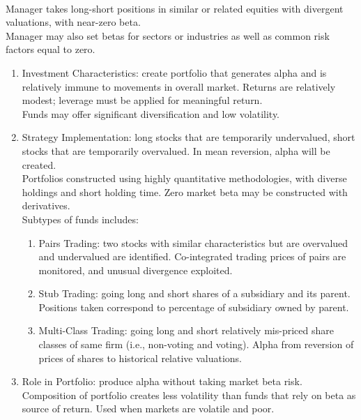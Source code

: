 \begin{remark} \\
Manager takes long-short positions in similar or related equities with divergent valuations, with near-zero beta.\\
Manager may also set betas for sectors or industries as well as common risk factors equal to zero.
\begin{enumerate}[label=\roman*.]
\setlength{\itemsep}{0pt}
\item Investment Characteristics: create portfolio that generates alpha and is relatively immune to movements in overall market. Returns are relatively modest; leverage must be applied for meaningful return.\\
Funds may offer significant diversification and low volatility.
\item Strategy Implementation: long stocks that are temporarily undervalued, short stocks that are temporarily overvalued. In mean reversion, alpha will be created.\\
Portfolios constructed using highly quantitative methodologies, with diverse holdings and short holding time. Zero market beta may be constructed with derivatives.\\
Subtypes of funds includes:
\begin{enumerate}[label=\arabic*.]
\setlength{\itemsep}{0pt}
\item Pairs Trading: two stocks with similar characteristics but are overvalued and undervalued are identified. Co-integrated trading prices of pairs are monitored, and unusual divergence exploited.
\item Stub Trading: going long and short shares of a subsidiary and its parent. Positions taken correspond to percentage of subsidiary owned by parent.
\item Multi-Class Trading: going long and short relatively mis-priced share classes of same firm (i.e., non-voting and voting). Alpha from reversion of prices of shares to historical relative valuations.
\end{enumerate}
\item Role in Portfolio: produce alpha without taking market beta risk. Composition of portfolio creates less volatility than funds that rely on beta as source of return. Used when markets are volatile and poor.
\end{enumerate}
\end{remark}

